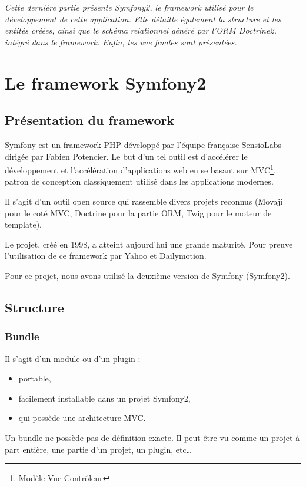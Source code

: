 \textit{Cette dernière partie présente Symfony2, le framework utilisé pour le développement de cette application. Elle détaille également la structure et les entités créées, ainsi que le schéma relationnel généré par l'ORM Doctrine2, intégré dans le framework. Enfin, les vue finales sont présentées.}

\section{Le framework Symfony2}
\subsection{Présentation du framework}
Symfony est un framework PHP développé par l'équipe française SensioLabs dirigée par Fabien Potencier. Le but d'un tel outil est d’accélérer le développement et l'accélération d'applications web en se basant sur MVC\footnote{Modèle Vue Contrôleur}, patron de conception classiquement utilisé dans les applications modernes.

Il s'agit d'un outil open source qui rassemble divers projets reconnus (Movaji pour le coté MVC, Doctrine pour la partie ORM, Twig pour le moteur de template).

Le projet, créé en 1998, a atteint aujourd'hui une grande maturité. Pour preuve l'utilisation de ce framework par Yahoo et Dailymotion.

Pour ce projet, nous avons utilisé la deuxième version de Symfony (Symfony2).

\subsection{Structure}

\subsubsection{Bundle}
Il s'agit d'un module ou d'un plugin :
\begin{itemize}
\item portable,
\item facilement installable dans un projet Symfony2,
\item qui possède une architecture MVC.
\end{itemize}

Un bundle ne possède pas de définition exacte. Il peut être vu comme un projet à part entière, une partie d'un projet, un plugin, etc\ldots

